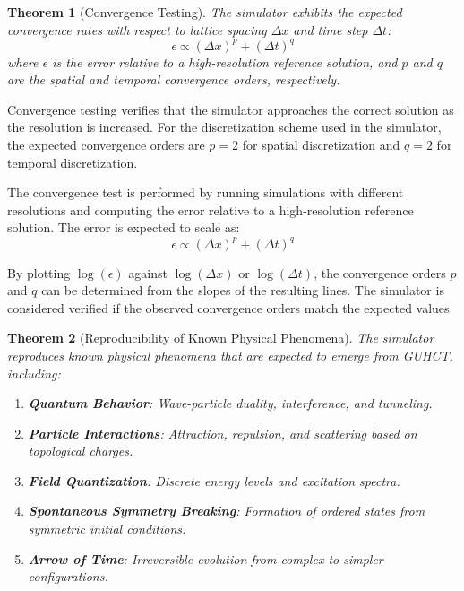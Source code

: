 \documentclass[11pt,a4paper]{article}
\makeatletter
\newtheorem{theorem}{Theorem}[section]
\renewenvironment{proof}[1][\proofname]{\par
  \pushQED{\qed}%
  \normalfont \topsep6\p@\@plus6\p@\relax
  \trivlist
  \item[\hskip\labelsep
        \itshape
    #1\@addpunct{.}]\ignorespaces
}{%
  \popQED\endtrivlist\@endpefalse
}
\makeatother
\begin{document}
\begin{theorem}[Convergence Testing]
\label{thm:convergence}
The simulator exhibits the expected convergence rates with respect to lattice spacing $\Delta x$ and time step $\Delta t$:
\begin{equation}
\epsilon \propto (\Delta x)^p + (\Delta t)^q
\end{equation}
where $\epsilon$ is the error relative to a high-resolution reference solution, and $p$ and $q$ are the spatial and temporal convergence orders, respectively.
\end{theorem}

\begin{proof}
Convergence testing verifies that the simulator approaches the correct solution as the resolution is increased. For the discretization scheme used in the simulator, the expected convergence orders are $p=2$ for spatial discretization and $q=2$ for temporal discretization.

The convergence test is performed by running simulations with different resolutions and computing the error relative to a high-resolution reference solution. The error is expected to scale as:
\begin{equation}
\epsilon \propto (\Delta x)^p + (\Delta t)^q
\end{equation}

By plotting $\log(\epsilon)$ against $\log(\Delta x)$ or $\log(\Delta t)$, the convergence orders $p$ and $q$ can be determined from the slopes of the resulting lines. The simulator is considered verified if the observed convergence orders match the expected values.
\end{proof}

\begin{theorem}[Reproducibility of Known Physical Phenomena]
\label{thm:reproducibility}
The simulator reproduces known physical phenomena that are expected to emerge from GUHCT, including:
\begin{enumerate}
    \item \textbf{Quantum Behavior}: Wave-particle duality, interference, and tunneling.
    
    \item \textbf{Particle Interactions}: Attraction, repulsion, and scattering based on topological charges.
    
    \item \textbf{Field Quantization}: Discrete energy levels and excitation spectra.
    
    \item \textbf{Spontaneous Symmetry Breaking}: Formation of ordered states from symmetric initial conditions.
    
    \item \textbf{Arrow of Time}: Irreversible evolution from complex to simpler configurations.
\end{enumerate}
\end{theorem}
\end{document}
